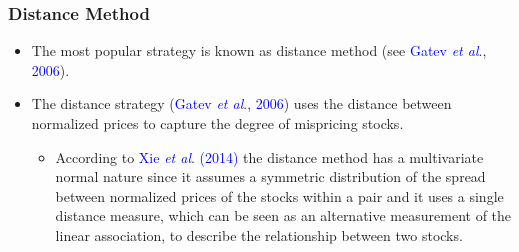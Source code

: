 \documentclass[pdf,9pt,xcolor=dvipsnames,hide notes]{beamer}
\begin{document}
\begin{frame}[label=frame1]
\frametitle{Distance Method}

\begin{itemize}
	\justifying
			
			\item The most popular strategy is known as distance method (see \textcolor{blue}{Gatev \emph{et al}}., \textcolor{blue}{2006}). 
			
		    \vspace{0.3cm}
			
			\item The distance strategy (\textcolor{blue}{Gatev \emph{et al}}., \textcolor{blue}{2006}) uses the distance between normalized prices to capture the degree of mispricing stocks. 
		
			\vspace{0.1cm}
			
			\begin{itemize}
				\item According to \textcolor{blue}{Xie \emph{et al}}. \textcolor{blue}{(2014)} the distance method has a multivariate normal nature since it assumes a symmetric distribution of the spread between normalized prices of the stocks within a pair and it uses a single distance measure, which can be seen as an alternative measurement of the linear association, to describe the relationship between two stocks.
			\end{itemize}
			
		\end{itemize}	
	\end{frame}
	
	
	
\end{document}
